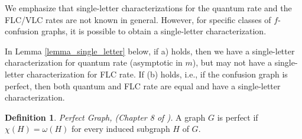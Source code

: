 \documentclass[journal, onecolumn, draftcls]{IEEEtran}
\theoremstyle{definition}
\newtheorem{definition}{Definition}
\newcommand{\aditya}[1]{\marginpar{+}{\bf Aditya's remark}: {\em #1}}
\begin{document}

We emphasize that single-letter characterizations for the quantum rate and the FLC/VLC rates are not known in general. However,  for specific classes of $f$-confusion graphs, it is possible to obtain a single-letter characterization. 




In Lemma \ref{lemma_single_letter} below, if a) holds, then we have a single-letter characterization for quantum rate (asymptotic in $m$), but may not have a single-letter characterization for FLC rate. If (b) holds, i.e., if the confusion graph is perfect, then both quantum and FLC rate are equal and have a single-letter characterization. 

\begin{definition}{\it Perfect Graph, (Chapter 8 of \cite{west_2000}).}
A graph $G$ is perfect if $\chi(H)=\omega(H)$ for every induced subgraph $H$ of $G$.
\end{definition}
\end{document}

